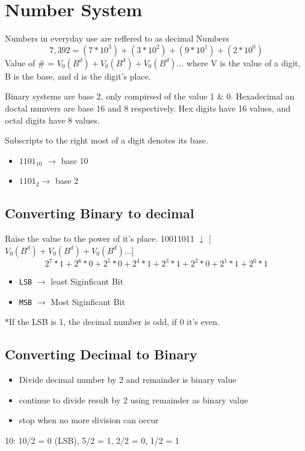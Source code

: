 \documentclass[a4paper,12pt]{article}
\begin{document}
        \section*{Number System}
        Numbers in everyday use are reffered to as decimal Numbers
        \[7,392=(7*10^3)+(3*10^2)+(9*10^1)+(2*10^0)\]
        Value of \# = $V_0(B^d)+V_0(B^d)+V_0(B^d)...$ where V is the value of a digit, B is the base, and d is the digit's place.\par 
        Binary systems are base 2, only compirsed of the value 1 \& 0. Hexadecimal an doctal numvers are base 16 and 8 respectively. Hex digits have 16 values, and octal digits have 8 values. \par
        Subscripts to the right most of a digit denotes its base.
        \begin{itemize}
            \item $1101_{10}$ $\rightarrow$ base 10
            \item $1101_{2}\rightarrow$ base 2 
        \end{itemize}

        \subsection*{Converting Binary to decimal}
        Raise the value to the power of it's place.
        10011011 $\downarrow$ [$V_0(B^d)+V_0(B^d)+V_0(B^d)...$]
        \[2^7*1+2^6*0+2^5*0+2^4*1+2^3*1+2^2*0+2^1*1+2^0*1\]
        \begin{itemize}
            \item \texttt{LSB} $\rightarrow$ least Siginficant Bit
            \item \texttt{MSB} $\rightarrow$ Most Siginficant Bit
        \end{itemize}
        *If the LSB is 1, the decimal number is odd, if 0 it's even.

        \subsection*{Converting Decimal to Binary}
            \begin{itemize}
                \item Divide decimal number by 2 and remainder is binary value
                \item continue to divide result by 2 using remainder as binary value
                \item stop when no more division can occur
            \end{itemize}
            10: 10/2 = 0 (LSB), 5/2 = 1, 2/2 = 0, 1/2 = 1
\end{document}
